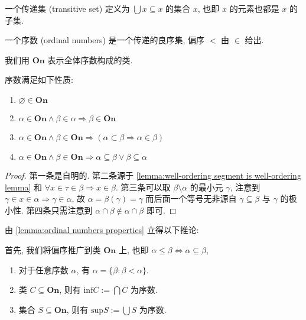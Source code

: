\begin{definition}
    一个传递集 (transitive set) 定义为 \(\bigcup x \subseteq x\) 的集合 \(x\), 也即 \(x\) 的元素也都是 \(x\) 的子集.
\end{definition}

\begin{definition}
    \label{definition:ordinal}
    一个序数 (ordinal numbers) 是一个传递的良序集, 偏序 \(<\) 由 \(\in\) 给出.
\end{definition}

我们用 \(\mathbf{On}\) 表示全体序数构成的类.

\begin{lemma}
    \label{lemma:ordinal numbers properties}
    序数满足如下性质:

    \begin{enumerate}
        \item \(\varnothing \in \mathbf{On}\) 
        \item \(\alpha \in \mathbf{On} \land \beta \in \alpha \Rightarrow \beta \in \mathbf{On}\)
        \item \(\alpha \in \mathbf{On} \land \beta \in \mathbf{On} \Rightarrow (\alpha \subset \beta \Rightarrow \alpha \in \beta)\)
        \item \(\alpha \in \mathbf{On} \land \beta \in \mathbf{On} \Rightarrow \alpha \subseteq \beta \lor \beta \subseteq \alpha\)
    \end{enumerate}

    \begin{proof}
        第一条是自明的. 第二条源于 \ref{lemma:well-ordering segment is well-ordering lemma} 和
        \(\forall x \in \tau \in \beta \Rightarrow x \in \beta\). 第三条可以取 \(\beta \setminus \alpha\) 的最小元 \(\gamma\),
        注意到 \(\gamma \in x \in \alpha \Rightarrow \gamma \in \alpha\), 故 \(\alpha = \beta(\gamma) = \gamma\) 而后面一个等号无非源自 \(\gamma \subseteq \beta\) 与 \(\gamma\) 的极小性.
        第四条只需注意到 \(\alpha \cap \beta \notin \alpha \cap \beta\) 即可.
    \end{proof}
\end{lemma}

由 \ref{lemma:ordinal numbers properties} 立得以下推论:

\begin{corollary}
    \label{corollary:ordinal numbers properties}
    首先, 我们将偏序推广到类 \(\mathbf{On}\) 上, 也即 \(\alpha \le \beta \Leftrightarrow \alpha \subseteq \beta\),

    \begin{enumerate}
        \item 对于任意序数 \(\alpha\), 有 \(\alpha = \{\beta : \beta < \alpha\}\).
        \item 类 \(C \subseteq \mathbf{On}\), 则有 \(\mathrm{inf} C := \bigcap C\) 为序数.
        \item 集合 \(S \subseteq \mathbf{On}\), 则有 \(\mathrm{sup} S := \bigcup S\) 为序数.
    \end{enumerate}
\end{corollary}

